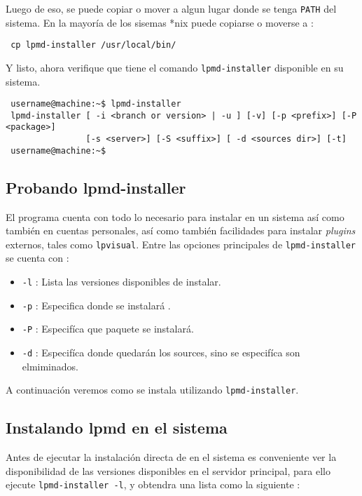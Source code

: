 Luego de eso, se puede copiar o mover a algun lugar donde se tenga \verb|PATH| del sistema. En la mayor\'ia de los sisemas *nix puede copiarse o moverse a :

\begin{verbatim}
 cp lpmd-installer /usr/local/bin/
\end{verbatim}

Y listo, ahora verifique que tiene el comando \verb|lpmd-installer| disponible en su sistema.
\begin{verbatim}
 username@machine:~$ lpmd-installer 
 lpmd-installer [ -i <branch or version> | -u ] [-v] [-p <prefix>] [-P <package>] 
                [-s <server>] [-S <suffix>] [ -d <sources dir>] [-t]
 username@machine:~$
\end{verbatim}

\subsection{Probando lpmd-installer}
El programa cuenta con todo lo necesario para instalar {\lpmd} en un sistema as\'i como tambi\'en en cuentas personales, as\'i como tambi\'en facilidades para instalar \textit{plugins} externos, tales como \verb|lpvisual|. Entre las opciones principales de \verb|lpmd-installer| se cuenta con :

\begin{itemize}
 \item \verb|-l| : Lista las versiones disponibles de instalar.
 \item \verb|-p| : Especifica donde se instalar\'a {\lpmd}.
 \item \verb|-P| : Especif\'ica que paquete se instalar\'a.
 \item \verb|-d| : Especif\'ica donde quedar\'an los sources, sino se especif\'ica son elmiminados.
\end{itemize}

A continuaci\'on veremos como se instala {\lpmd} utilizando \verb|lpmd-installer|.

\subsection{Instalando lpmd en el sistema}

Antes de ejecutar la instalaci\'on directa de {\lpmd} en el sistema es conveniente ver la disponibilidad de las versiones disponibles en el servidor principal, para ello ejecute \verb|lpmd-installer -l|, y obtendra una lista como la siguiente :

